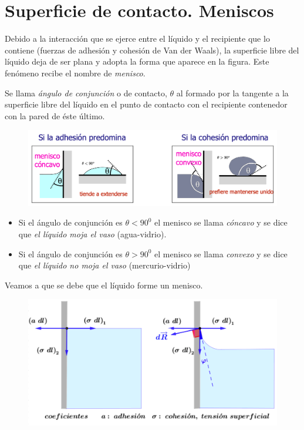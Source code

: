 \section{Superficie de contacto. Meniscos}
Debido a la interacción que se ejerce entre el líquido y el recipiente que lo contiene (fuerzas de adhesión y cohesión de Van der Waals), la superficie libre del líquido deja de ser plana y adopta la forma que aparece en la figura. Este fenómeno recibe el nombre de \emph{menisco}.

Se llama \emph{ángulo de conjunción} o de contacto, $\theta$ al formado por la tangente a la superficie libre del líquido en el punto de contacto con el recipiente contenedor con la pared de éste último.
\vspace{-3mm} %
\begin{figure}[H]
	\centering
	\includegraphics[width=.9\textwidth]{imagenes/imagenes08/T08IM04.png}
\end{figure}
\vspace{-3mm} %
\begin{itemize}
\item Si el ángulo de conjunción es $\theta<90^0$ el menisco se llama \emph{cóncavo} y se dice que \emph{el líquido moja el vaso} (agua-vidrio).

\item Si el ángulo de conjunción es $\theta>90^0$ el menisco se llama \emph{convexo} y se dice que \emph{el líquido no moja el vaso} (mercurio-vidrio)
\end{itemize}

Veamos a que se debe que el líquido forme un menisco.
\vspace{-3mm} %
\begin{figure}[H]
	\centering
	\includegraphics[width=1\textwidth]{imagenes/imagenes08/T08IM05.png}
\end{figure}


